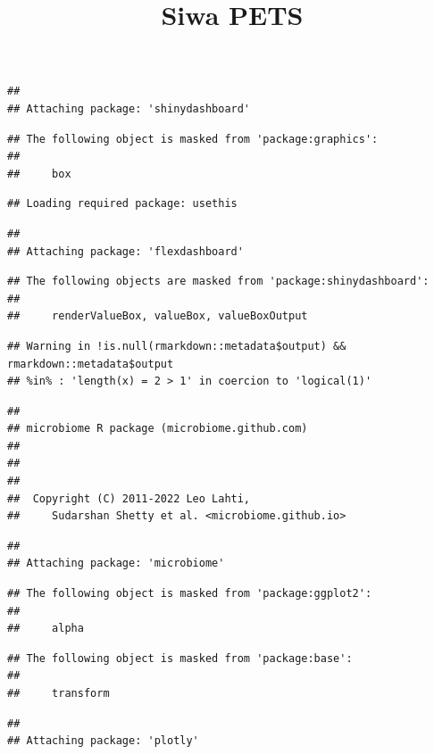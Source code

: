 \documentclass[
]{article}
\title{Siwa PETS}
\author{}
\date{\vspace{-2.5em}}
\begin{document}
\maketitle

\begin{verbatim}
## 
## Attaching package: 'shinydashboard'
\end{verbatim}

\begin{verbatim}
## The following object is masked from 'package:graphics':
## 
##     box
\end{verbatim}

\begin{verbatim}
## Loading required package: usethis
\end{verbatim}

\begin{verbatim}
## 
## Attaching package: 'flexdashboard'
\end{verbatim}

\begin{verbatim}
## The following objects are masked from 'package:shinydashboard':
## 
##     renderValueBox, valueBox, valueBoxOutput
\end{verbatim}

\begin{verbatim}
## Warning in !is.null(rmarkdown::metadata$output) && rmarkdown::metadata$output
## %in% : 'length(x) = 2 > 1' in coercion to 'logical(1)'
\end{verbatim}

\begin{verbatim}
## 
## microbiome R package (microbiome.github.com)
##     
## 
## 
##  Copyright (C) 2011-2022 Leo Lahti, 
##     Sudarshan Shetty et al. <microbiome.github.io>
\end{verbatim}

\begin{verbatim}
## 
## Attaching package: 'microbiome'
\end{verbatim}

\begin{verbatim}
## The following object is masked from 'package:ggplot2':
## 
##     alpha
\end{verbatim}

\begin{verbatim}
## The following object is masked from 'package:base':
## 
##     transform
\end{verbatim}

\begin{verbatim}
## 
## Attaching package: 'plotly'
\end{verbatim}
\end{document}
